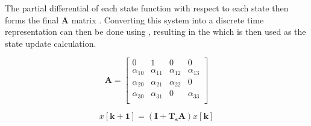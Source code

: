\documentclass[11pt,a4paper]{article}
\begin{document}
The partial differential of each state function with respect to each state then forms the final $\boldsymbol{A}$ matrix . Converting this system into a discrete time representation can then be done using , resulting in the  which is then used as the state update calculation. \newline

\begin{equation}
    \boldsymbol{A} =
    \begin{bmatrix}
        0 & 1 & 0 & 0\\
        \alpha_{10} & \alpha_{11} & \alpha_{12} & \alpha_{13}\\
        \alpha_{20} & \alpha_{21} & \alpha_{22} & 0\\
        \alpha_{30} & \alpha_{31} & 0 & \alpha_{33}\\
    \end{bmatrix}
    \label{math:A_matrix}
\end{equation}

\begin{equation}
        x\left[\boldsymbol{k+1}\right] = \left(\boldsymbol{\boldsymbol{I}+T_s\boldsymbol{A}}\right)x\left[\boldsymbol{k}\right]
    \label{math:discrete_formula}
\end{equation}
\end{document}
